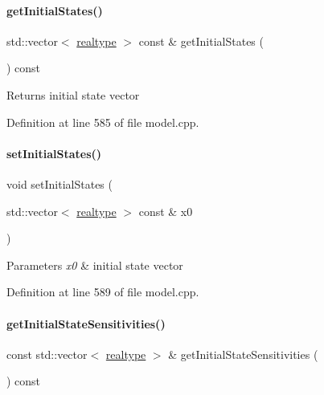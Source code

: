 \paragraph{\texorpdfstring{get\+Initial\+States()}{getInitialStates()}}
{\footnotesize\ttfamily std\+::vector$<$ \mbox{\hyperlink{namespaceamici_a1bdce28051d6a53868f7ccbf5f2c14a3}{realtype}} $>$ const  \& get\+Initial\+States (\begin{DoxyParamCaption}{ }\end{DoxyParamCaption}) const}

\begin{DoxyReturn}{Returns}
initial state vector 
\end{DoxyReturn}


Definition at line 585 of file model.\+cpp.

\mbox{\label{classamici_1_1_model_ada7cb3dadf4cee4b8fd6f092fee54b3c}} 
\paragraph{\texorpdfstring{set\+Initial\+States()}{setInitialStates()}}
{\footnotesize\ttfamily void set\+Initial\+States (\begin{DoxyParamCaption}\item[{std\+::vector$<$ \mbox{\hyperlink{namespaceamici_a1bdce28051d6a53868f7ccbf5f2c14a3}{realtype}} $>$ const \&}]{x0 }\end{DoxyParamCaption})}


\begin{DoxyParams}{Parameters}
{\em x0} & initial state vector \\
\hline
\end{DoxyParams}


Definition at line 589 of file model.\+cpp.

\mbox{\label{classamici_1_1_model_a989b8202ceac7b6f94bb1503519a56fb}} 
\paragraph{\texorpdfstring{get\+Initial\+State\+Sensitivities()}{getInitialStateSensitivities()}}
{\footnotesize\ttfamily const std\+::vector$<$ \mbox{\hyperlink{namespaceamici_a1bdce28051d6a53868f7ccbf5f2c14a3}{realtype}} $>$ \& get\+Initial\+State\+Sensitivities (\begin{DoxyParamCaption}{ }\end{DoxyParamCaption}) const}

